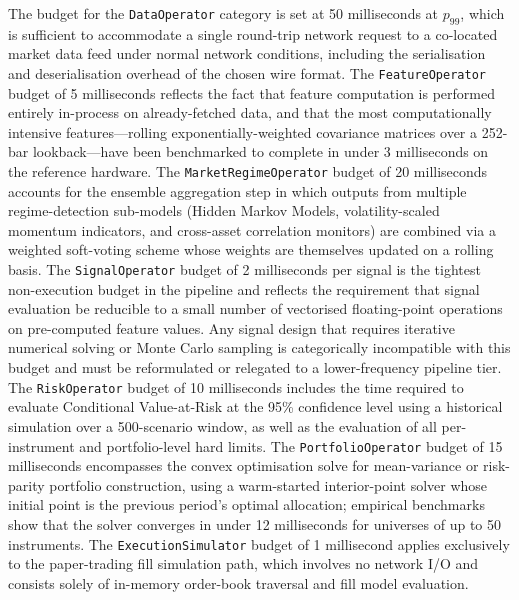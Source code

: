 \documentclass[12pt,openany]{book}
\numberwithin{equation}{chapter}
\theoremstyle{plain}
\theoremstyle{definition}
\theoremstyle{remark}
\begin{document}
The budget for the \texttt{DataOperator} category is set at 50 milliseconds at $p_{99}$, which is sufficient to accommodate a single round-trip network request to a co-located market data feed under normal network conditions, including the serialisation and deserialisation overhead of the chosen wire format. The \texttt{FeatureOperator} budget of 5 milliseconds reflects the fact that feature computation is performed entirely in-process on already-fetched data, and that the most computationally intensive features—rolling exponentially-weighted covariance matrices over a 252-bar lookback—have been benchmarked to complete in under 3 milliseconds on the reference hardware. The \texttt{MarketRegimeOperator} budget of 20 milliseconds accounts for the ensemble aggregation step in which outputs from multiple regime-detection sub-models (Hidden Markov Models, volatility-scaled momentum indicators, and cross-asset correlation monitors) are combined via a weighted soft-voting scheme whose weights are themselves updated on a rolling basis. The \texttt{SignalOperator} budget of 2 milliseconds per signal is the tightest non-execution budget in the pipeline and reflects the requirement that signal evaluation be reducible to a small number of vectorised floating-point operations on pre-computed feature values. Any signal design that requires iterative numerical solving or Monte Carlo sampling is categorically incompatible with this budget and must be reformulated or relegated to a lower-frequency pipeline tier. The \texttt{RiskOperator} budget of 10 milliseconds includes the time required to evaluate Conditional Value-at-Risk at the 95\% confidence level using a historical simulation over a 500-scenario window, as well as the evaluation of all per-instrument and portfolio-level hard limits. The \texttt{PortfolioOperator} budget of 15 milliseconds encompasses the convex optimisation solve for mean-variance or risk-parity portfolio construction, using a warm-started interior-point solver whose initial point is the previous period's optimal allocation; empirical benchmarks show that the solver converges in under 12 milliseconds for universes of up to 50 instruments. The \texttt{ExecutionSimulator} budget of 1 millisecond applies exclusively to the paper-trading fill simulation path, which involves no network I/O and consists solely of in-memory order-book traversal and fill model evaluation.
\end{document}
